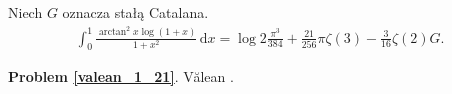%

\begin{problem_with_solution}
    \label{valean_1_21}%
    Niech $G$ oznacza stałą Catalana.
    \begin{align}
        \int_0^1 \frac{\arctan^2 x \log (1 + x)}{1 + x^2} \,\mathrm{d} x = \log 2 \frac {\pi^3}{384} + \frac {21}{256} \pi \zeta(3) - \frac{3}{16} \zeta (2) G.
    \end{align} 
\end{problem_with_solution}



\textbf{Problem \ref{valean_1_21}}.
Vălean \cite[s. 12]{nahin15}.


%